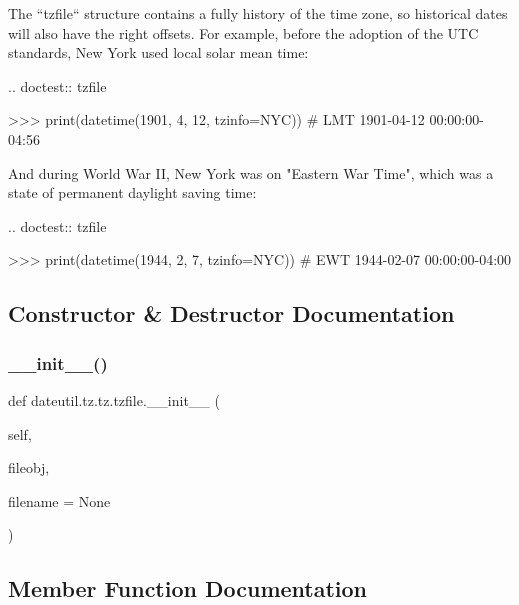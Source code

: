 \begin{DoxyVerb}
The ``tzfile`` structure contains a fully history of the time zone,
so historical dates will also have the right offsets. For example, before
the adoption of the UTC standards, New York used local solar  mean time:

.. doctest:: tzfile

   >>> print(datetime(1901, 4, 12, tzinfo=NYC))    # LMT
   1901-04-12 00:00:00-04:56

And during World War II, New York was on "Eastern War Time", which was a
state of permanent daylight saving time:

.. doctest:: tzfile

    >>> print(datetime(1944, 2, 7, tzinfo=NYC))    # EWT
    1944-02-07 00:00:00-04:00\end{DoxyVerb}
 

\subsection{Constructor \& Destructor Documentation}
\mbox{\label{classdateutil_1_1tz_1_1tz_1_1tzfile_ab69d4b19e76529f70b57573027839e99}} 
\subsubsection{\texorpdfstring{\+\_\+\+\_\+init\+\_\+\+\_\+()}{\_\_init\_\_()}}
{\footnotesize\ttfamily def dateutil.\+tz.\+tz.\+tzfile.\+\_\+\+\_\+init\+\_\+\+\_\+ (\begin{DoxyParamCaption}\item[{}]{self,  }\item[{}]{fileobj,  }\item[{}]{filename = {\ttfamily None} }\end{DoxyParamCaption})}



\subsection{Member Function Documentation}
\mbox{\label{classdateutil_1_1tz_1_1tz_1_1tzfile_a51e376f853af97b8db20702c26b97c3d}} 
